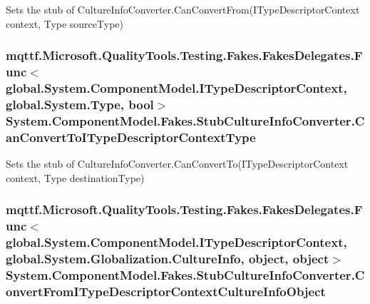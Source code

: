 Sets the stub of Culture\-Info\-Converter.\-Can\-Convert\-From(\-I\-Type\-Descriptor\-Context context, Type source\-Type)

\hypertarget{class_system_1_1_component_model_1_1_fakes_1_1_stub_culture_info_converter_ae3dfe7aaa7ae017c08b68c51184a6fff}{
\subsubsection[{Can\-Convert\-To\-I\-Type\-Descriptor\-Context\-Type}]{\setlength{\rightskip}{0pt plus 5cm}mqttf.\-Microsoft.\-Quality\-Tools.\-Testing.\-Fakes.\-Fakes\-Delegates.\-Func$<$global.\-System.\-Component\-Model.\-I\-Type\-Descriptor\-Context, global.\-System.\-Type, bool$>$ System.\-Component\-Model.\-Fakes.\-Stub\-Culture\-Info\-Converter.\-Can\-Convert\-To\-I\-Type\-Descriptor\-Context\-Type}}\label{class_system_1_1_component_model_1_1_fakes_1_1_stub_culture_info_converter_ae3dfe7aaa7ae017c08b68c51184a6fff}


Sets the stub of Culture\-Info\-Converter.\-Can\-Convert\-To(\-I\-Type\-Descriptor\-Context context, Type destination\-Type)

\hypertarget{class_system_1_1_component_model_1_1_fakes_1_1_stub_culture_info_converter_aee14caa9558091bce95583cbac173aab}{
\subsubsection[{Convert\-From\-I\-Type\-Descriptor\-Context\-Culture\-Info\-Object}]{\setlength{\rightskip}{0pt plus 5cm}mqttf.\-Microsoft.\-Quality\-Tools.\-Testing.\-Fakes.\-Fakes\-Delegates.\-Func$<$global.\-System.\-Component\-Model.\-I\-Type\-Descriptor\-Context, global.\-System.\-Globalization.\-Culture\-Info, object, object$>$ System.\-Component\-Model.\-Fakes.\-Stub\-Culture\-Info\-Converter.\-Convert\-From\-I\-Type\-Descriptor\-Context\-Culture\-Info\-Object}}\label{class_system_1_1_component_model_1_1_fakes_1_1_stub_culture_info_converter_aee14caa9558091bce95583cbac173aab}


